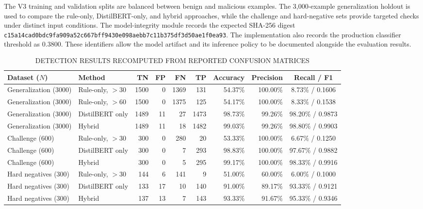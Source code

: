 \documentclass[conference]{IEEEtran}
\begin{document}
The V3 training and validation splits are balanced between benign and malicious examples. The 3,000-example generalization holdout is used to compare the rule-only, DistilBERT-only, and hybrid approaches, while the challenge and hard-negative sets provide targeted checks under distinct input conditions. The model-integrity module records the expected SHA-256 digest \texttt{c15a14cad0bdc9fa909a52c667bff9430e098aebb7c11b375df3d50ae1f0ea93}. The implementation also records the production classifier threshold as 0.3800. These identifiers allow the model artifact and its inference policy to be documented alongside the evaluation results.

\begin{table}[t]
\caption{DETECTION RESULTS RECOMPUTED FROM REPORTED CONFUSION MATRICES}
\label{tab:results}
\centering
\begin{tabular}{llrrrrrrc}
\toprule
\textbf{Dataset ($N$)} & \textbf{Method} & \textbf{TN} & \textbf{FP} & \textbf{FN} & \textbf{TP} & \textbf{Accuracy} & \textbf{Precision} & \textbf{Recall / F1} \\
\midrule
Generalization (3000) & Rule-only, $> 30$ & 1500 & 0 & 1369 & 131 & 54.37\% & 100.00\% & 8.73\% / 0.1606 \\
Generalization (3000) & Rule-only, $> 60$ & 1500 & 0 & 1375 & 125 & 54.17\% & 100.00\% & 8.33\% / 0.1538 \\
Generalization (3000) & DistilBERT only & 1489 & 11 & 27 & 1473 & 98.73\% & 99.26\% & 98.20\% / 0.9873 \\
Generalization (3000) & Hybrid & 1489 & 11 & 18 & 1482 & 99.03\% & 99.26\% & 98.80\% / 0.9903 \\
\midrule
Challenge (600) & Rule-only, $> 30$ & 300 & 0 & 280 & 20 & 53.33\% & 100.00\% & 6.67\% / 0.1250 \\
Challenge (600) & DistilBERT only & 300 & 0 & 7 & 293 & 98.83\% & 100.00\% & 97.67\% / 0.9882 \\
Challenge (600) & Hybrid & 300 & 0 & 5 & 295 & 99.17\% & 100.00\% & 98.33\% / 0.9916 \\
\midrule
Hard negatives (300) & Rule-only, $> 30$ & 144 & 6 & 141 & 9 & 51.00\% & 60.00\% & 6.00\% / 0.1000 \\
Hard negatives (300) & DistilBERT only & 133 & 17 & 10 & 140 & 91.00\% & 89.17\% & 93.33\% / 0.9121 \\
Hard negatives (300) & Hybrid & 137 & 13 & 7 & 143 & 93.33\% & 91.67\% & 95.33\% / 0.9346 \\
\bottomrule
\end{tabular}
\end{table}
\end{document}
